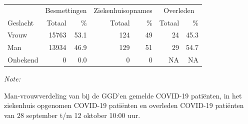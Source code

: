 \documentclass[
  english,
  man,floatsintext]{apa6}
\begin{document}
\begin{table}
\centering\begingroup\fontsize{11}{13}\selectfont

\begin{threeparttable}
\begin{tabular}{lrrrrrr}
\toprule
\multicolumn{1}{c}{ } & \multicolumn{2}{c}{Besmettingen} & \multicolumn{2}{c}{Ziekenhuisopnames} & \multicolumn{2}{c}{Overleden} \\
\cmidrule(l{3pt}r{3pt}){2-3} \cmidrule(l{3pt}r{3pt}){4-5} \cmidrule(l{3pt}r{3pt}){6-7}
Geslacht & Totaal & \% & Totaal & \% & Totaal & \%\\
\midrule
Vrouw & 15763 & 53.1 & 124 & 49 & 24 & 45.3\\
Man & 13934 & 46.9 & 129 & 51 & 29 & 54.7\\
Onbekend & 0 & 0.0 & 0 & 0 & NA & NA\\
\bottomrule
\end{tabular}
\begin{tablenotes}
\item \textit{Note: } 
\item Man-vrouwverdeling van bij de GGD’en gemelde COVID-19 patiënten, in het ziekenhuis opgenomen COVID-19 patiënten en overleden COVID-19 patiënten van 28 september t/m 12 oktober 10:00 uur.
\end{tablenotes}
\end{threeparttable}
\endgroup{}
\end{table}
\newpage
\end{document}
